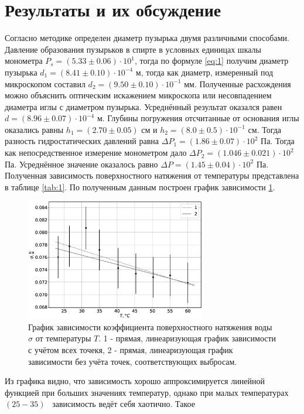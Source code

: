 \documentclass[12pt]{article}
\begin{document}
\section{Результаты и их обсуждение}
Согласно методике определен диаметр пузырька двумя различными способами. Давление образования пузырьков 
в спирте в условных единицах шкалы монометра $P_s = (5.33 \pm 0.06) \cdot 10 ^ {1}$, тогда по формуле \ref{eq:1} получим диаметр 
пузырька $d_1 = (8.41 \pm 0.10) \cdot 10 ^ {-4}$ м, тогда как диаметр, измеренный под микроскопом составил $d_2 = (9.50 \pm 0.10) \cdot 10 ^ {-1}$ мм. Полученные расхождения 
можно объяснить оптическим искажением микроскопа или несовпадением диаметра иглы с диаметром пузырька.
Усреднённый результат оказался равен $d = (8.96 \pm 0.07) \cdot 10 ^ {-4}$ м. 
Глубины погружения отсчитанные от основания иглы оказались равны $h_1 = (2.70 \pm 0.05)$ см и $h_2 = (8.0 \pm 0.5) \cdot 10 ^ {-1}$ см. 
Тогда разность гидростатических давлений равна $\Delta P_1 = (1.86 \pm 0.07) \cdot 10 ^ {2}$ Па. Тогда как непосредственное 
измерение монометром дало $\Delta P_2 = (1.046 \pm 0.021) \cdot 10 ^ {2}$ Па. Усреднённое значение оказалось равно $\Delta P = (1.45 \pm 0.04) \cdot 10 ^ {2}$ Па. 
Полученная зависимость поверхностного натяжения от температуры представлена в таблице \ref{tab:1}. По 
полученным данным построен график зависимости \ref{fig:2}.  
\begin{figure}[H]
    \centering
    \includegraphics[width=0.7\textwidth]{sT.eps}
    \caption{График зависимости коэффициента поверхностного натяжения воды $\sigma$ от температуры $T$.
        1 - прямая, линеаризующая график зависимости с учётом всех точекя, 
        2 - прямая, линеаризующая график зависимости без учёта точек, соответствующих выбросам.}
    \label{fig:2}
\end{figure}
Из графика видно, что зависимость хорошо аппроксимируется линейной функцией при больших значениях температур, 
однако при малых температурах $(25 - 35)$ \textcelsius \, зависимость ведёт себя хаотично. Такое 
\end{document}
